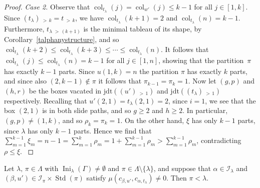 \documentclass[ALCO,ThmDefs,Unicode,epreuves]{cedram}
\newenvironment{Case}[1]{\smallskip\noindent\emph{Case #1}\endgraf
 \nobreak\noindent\ignorespaces}{\endgraf\smallskip}
\DeclareMathOperator{\Ini}{Ini}
\DeclareMathOperator{\col}{col}
\newcommand{\morethan}[2]{#1\,{_{>\,#2}}}
\newcommand{\jdt}{\mathrm{jdt}}
\DeclareMathOperator{\STD}{Std}
\begin{document}
\begin{proof}
\begin{Case}{2. }
Observe that $\col_{t_\lambda}(j)=\col_{w'}(j)\leqslant k-1$ for all $j\in[1,k]$. Since
$\morethan {(t_\lambda)}k=\morethan tk$, we have $\col_{t_\lambda}(k+1)=2$ and
$\col_{t_\lambda}(n)=k-1$. Furthermore, $\morethan{t_\lambda}{(k+1)}$ is the minimal
tableau of its shape, by Corollary~\ref{talphanystructure}, and so
$\col_{t_\lambda}(k+2)\leqslant\col_{t_\lambda}(k+3)\leqslant\cdots\leqslant\col_{t_\lambda}(n)$.
It follows that $\col_{t_\lambda}(j)\leqslant\col_{t_\lambda}(n)=k-1$ for all $j\in[1,n]$,
showing that the partition~$\pi$ has exactly $k-1$ parts.
Since $u(1,k)=n$ the partition $\pi$ has exactly $k$ parts, and since also $(2,k-1)\notin\pi$
it follows that $\pi_{k-1}=\pi_k=1$. Now let $(g,p)$ and $(h,r)$ be the boxes vacated in
$\jdt(\morethan{(u')}{1})$ and $\jdt(\morethan{(t_\lambda)}{1})$ respectively. Recalling that
$u'(2,1)=t_\lambda(2,1)=2$, since $i=1$, we see that the box $(2,1)$ is in both slide paths,
and so $g\geqslant 2$ and $h\geqslant 2$. In particular, $(g,p)\ne(1,k)$, and so
$\rho_k=\pi_k=1$. On the other hand, $\xi$ has only $k-1$ parts, since $\lambda$ has
only $k-1$ parts. Hence we find that
$\sum_{m=1}^{k-1}\xi_m=n-1=\sum_{m=1}^{k}\rho_m=1+\sum_{m=1}^{k-1}\rho_m>\sum_{m=1}^{k-1}\rho_m$,
contradicting $\rho\leqslant\xi$.\qedhere
\end{Case}
\end{proof}

\begin{lemm}\label{kminimimalcompared}
Let $\lambda,\,\pi\in\Lambda$ with $\Ini_\lambda(\Gamma)\ne\emptyset$ and
$\pi\in\Lambda\setminus\{\lambda\}$, and suppose that $\alpha\in\mathcal I_\lambda$
and $(\beta,u')\in\mathcal I_\pi\times\STD(\pi)$ satisfy
$\mu(c_{\beta,u'},c_{\alpha,t_\lambda})\neq 0$.
Then $\pi<\lambda$.
\end{lemm}
\end{document}
